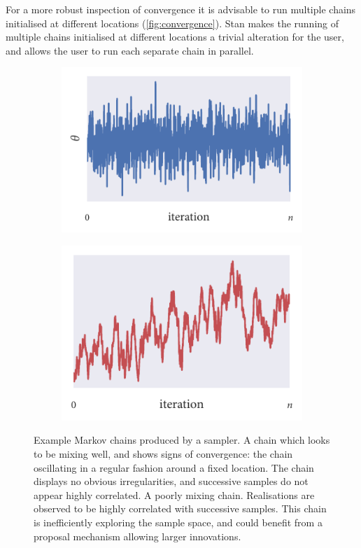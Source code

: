 For a more robust inspection of convergence it is advisable to run multiple
chains initialised at different locations (\cref{fig:convergence}). Stan makes
the running of multiple chains initialised at different locations a trivial
alteration for the user, and allows the user to run each separate chain in
parallel.

\begin{figure}[tpb]
  \begin{subfigure}[b]{0.5\textwidth}
    \centering
    \includegraphics{good_mixing.pdf}
    \subcaption{}
    \label{fig:good_mixing}
  \end{subfigure}%
  \begin{subfigure}[b]{0.5\textwidth}
    \centering
    \includegraphics{poor_mixing.pdf}
    \subcaption{}
    \label{fig:poor_mixing}
  \end{subfigure}
  \caption{Example Markov chains produced by a sampler.
     A chain which looks to be mixing well, and shows
    signs of convergence: the chain oscillating in a regular fashion around a
    fixed location. The chain displays no obvious irregularities, and
    successive samples do not appear highly correlated.
     A poorly mixing chain. Realisations are observed
    to be highly correlated with successive samples. This chain is
    inefficiently exploring the sample space, and could benefit from a proposal
    mechanism allowing larger innovations.}
  \label{fig:mixing}
\end{figure}

